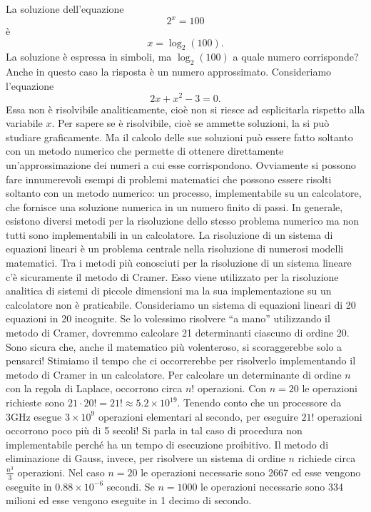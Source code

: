 \documentclass{article}
\theoremstyle{plain}
\theoremstyle{definition}
\theoremstyle{remark}
\begin{document}
La soluzione dell'equazione
\[ 2^x = 100 \]
è
\[ x = \log_2(100). \]
La soluzione è espressa in simboli, ma \( \log_2(100) \) a quale numero corrisponde?
Anche in questo caso la risposta è un numero approssimato.
Consideriamo l'equazione
\[ 2x + x^2 - 3 = 0. \]
Essa non è risolvibile analiticamente, cioè non si riesce ad esplicitarla rispetto alla variabile \( x \).
Per sapere se è risolvibile, cioè se ammette soluzioni, la si può studiare graficamente.
Ma il calcolo delle sue soluzioni può essere fatto soltanto con un metodo numerico che permette di ottenere direttamente un'approssimazione dei numeri a cui esse corrispondono.
Ovviamente si possono fare innumerevoli esempi di problemi matematici che possono essere risolti soltanto con un metodo numerico: un processo, implementabile su un calcolatore, che fornisce una soluzione numerica in un numero finito di passi.
In generale, esistono diversi metodi per la risoluzione dello stesso problema numerico ma non tutti sono implementabili in un calcolatore.
La risoluzione di un sistema di equazioni lineari è un problema centrale nella risoluzione di numerosi modelli matematici.
Tra i metodi più conosciuti per la risoluzione di un sistema lineare c'è sicuramente il metodo di Cramer.
Esso viene utilizzato per la risoluzione analitica di sistemi di piccole dimensioni ma la sua implementazione su un calcolatore non è praticabile.
Consideriamo un sistema di equazioni lineari di 20 equazioni in 20 incognite.
Se lo volessimo risolvere “a mano” utilizzando il metodo di Cramer, dovremmo calcolare 21 determinanti ciascuno di ordine 20.
Sono sicura che, anche il matematico più volenteroso, si scoraggerebbe solo a pensarci!
Stimiamo il tempo che ci occorrerebbe per risolverlo implementando il metodo di Cramer in un calcolatore.
Per calcolare un determinante di ordine \( n \) con la regola di Laplace, occorrono circa \( n! \) operazioni.
Con \( n = 20 \) le operazioni richieste sono \( 21 \cdot 20! = 21! \approx 5.2 \times 10^{19} \).
Tenendo conto che un processore da 3GHz esegue \( 3 \times 10^9 \) operazioni elementari al secondo, per eseguire \( 21! \) operazioni occorrono poco più di 5 secoli!
Si parla in tal caso di procedura non implementabile perché ha un tempo di esecuzione proibitivo.
Il metodo di eliminazione di Gauss, invece, per risolvere un sistema di ordine \( n \) richiede circa \( \frac{n^3}{3} \) operazioni.
Nel caso \( n = 20 \) le operazioni necessarie sono 2667 ed esse vengono eseguite in \( 0.88 \times 10^{-6} \) secondi.
Se \( n = 1000 \) le operazioni necessarie sono 334 milioni ed esse vengono eseguite in 1 decimo di secondo.
\end{document}

